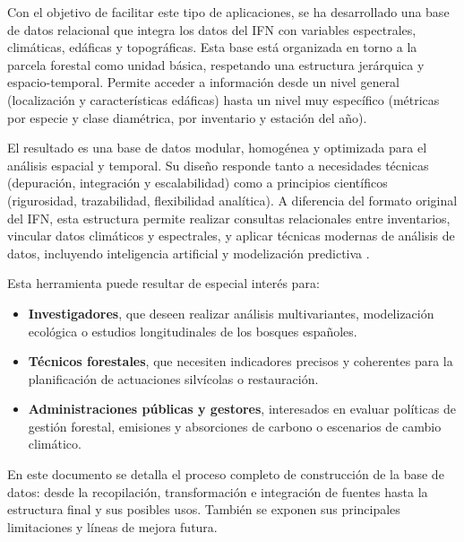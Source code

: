 \medskip

Con el objetivo de facilitar este tipo de aplicaciones, se ha desarrollado una base de datos relacional que integra los datos del IFN con variables espectrales, climáticas, edáficas y topográficas. Esta base está organizada en torno a la parcela forestal como unidad básica, respetando una estructura jerárquica y espacio-temporal. Permite acceder a información desde un nivel general (localización y características edáficas) hasta un nivel muy específico (métricas por especie y clase diamétrica, por inventario y estación del año).

\medskip

El resultado es una base de datos modular, homogénea y optimizada para el análisis espacial y temporal. Su diseño responde tanto a necesidades técnicas (depuración, integración y escalabilidad) como a principios científicos (rigurosidad, trazabilidad, flexibilidad analítica). A diferencia del formato original del IFN, esta estructura permite realizar consultas relacionales entre inventarios, vincular datos climáticos y espectrales, y aplicar técnicas modernas de análisis de datos, incluyendo inteligencia artificial y modelización predictiva \cite{copernicus_api,miteco_abexante_2025}.


Esta herramienta puede resultar de especial interés para:
\begin{itemize}
    \item \textbf{Investigadores}, que deseen realizar análisis multivariantes, modelización ecológica o estudios longitudinales de los bosques españoles.
    \item \textbf{Técnicos forestales}, que necesiten indicadores precisos y coherentes para la planificación de actuaciones silvícolas o restauración.
    \item \textbf{Administraciones públicas y gestores}, interesados en evaluar políticas de gestión forestal, emisiones y absorciones de carbono o escenarios de cambio climático.
\end{itemize}

En este documento se detalla el proceso completo de construcción de la base de datos: desde la recopilación, transformación e integración de fuentes hasta la estructura final y sus posibles usos. También se exponen sus principales limitaciones y líneas de mejora futura.